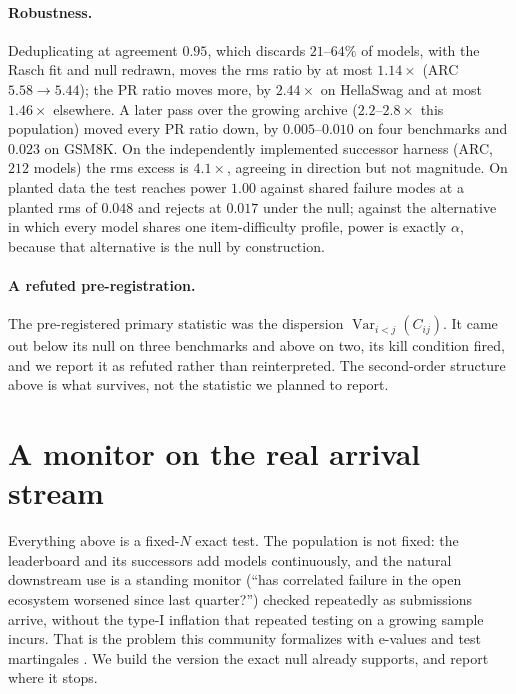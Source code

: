 \documentclass{article}
\begin{document}
\paragraph{Robustness.} Deduplicating at agreement $0.95$, which discards $21$--$64\%$ of models,
with the Rasch fit and null redrawn, moves the rms ratio by at most $1.14\times$ (ARC
$5.58\to5.44$); the PR ratio moves more, by $2.44\times$ on HellaSwag and at most $1.46\times$
elsewhere. A later pass over the growing archive ($2.2$--$2.8\times$ this population) moved every PR
ratio down, by $0.005$--$0.010$ on four benchmarks and $0.023$ on GSM8K. On the independently
implemented successor harness (ARC, $212$ models) the rms excess is $4.1\times$, agreeing in
direction but not magnitude. On planted data the test reaches power $1.00$ against shared failure
modes at a planted rms of $0.048$ and rejects at $0.017$ under the null; against the alternative in
which every model shares one item-difficulty profile, power is exactly $\alpha$, because that
alternative is the null by construction.

\paragraph{A refuted pre-registration.} The pre-registered primary statistic was the dispersion
$\operatorname{Var}_{i<j}(C_{ij})$. It came out below its null on three benchmarks and above on
two, its kill condition fired, and we report it as refuted rather than reinterpreted. The
second-order structure above is what survives, not the statistic we planned to report.

\section{A monitor on the real arrival stream}
\label{sec:evalues}

Everything above is a fixed-$N$ exact test. The population is not fixed: the leaderboard and its
successors add models continuously, and the natural downstream use is a standing monitor (``has
correlated failure in the open ecosystem worsened since last quarter?'') checked repeatedly as
submissions arrive, without the type-I inflation that repeated testing on a growing sample incurs.
That is the problem this community formalizes with e-values and test martingales
\citep{shafer2021,vovkwang2021,ramdas2023,grunwald2024}. We build the version the exact null
already supports, and report where it stops.
\end{document}
